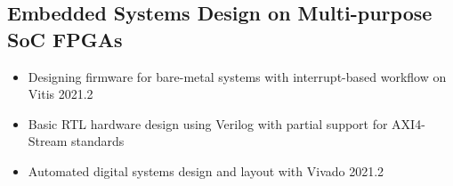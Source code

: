 \documentclass[10pt]{article}
\begin{document}
\subsection*{Embedded Systems Design on Multi-purpose SoC FPGAs}
\begin{itemize}
  \item Designing firmware for bare-metal systems with interrupt-based workflow
    on Vitis 2021.2
  \item Basic RTL hardware design using Verilog with partial support for
    AXI4-Stream standards
  \item Automated digital systems design and layout with Vivado 2021.2
\end{itemize}



\end{document}
